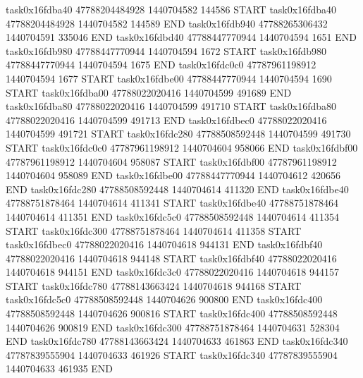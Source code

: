 task0x16fdba40 47788204484928          1440704582               144586  START
task0x16fdba40 47788204484928          1440704582               144589  END
task0x16fdb940 47788265306432          1440704591               335046  END
task0x16fdbd40 47788447770944          1440704594                 1651  END
task0x16fdb980 47788447770944          1440704594                 1672  START
task0x16fdb980 47788447770944          1440704594                 1675  END
task0x16fdc0c0 47787961198912          1440704594                 1677  START
task0x16fdbe00 47788447770944          1440704594                 1690  START
task0x16fdba00 47788022020416          1440704599               491689  END
task0x16fdba80 47788022020416          1440704599               491710  START
task0x16fdba80 47788022020416          1440704599               491713  END
task0x16fdbec0 47788022020416          1440704599               491721  START
task0x16fdc280 47788508592448          1440704599               491730  START
task0x16fdc0c0 47787961198912          1440704604               958066  END
task0x16fdbf00 47787961198912          1440704604               958087  START
task0x16fdbf00 47787961198912          1440704604               958089  END
task0x16fdbe00 47788447770944          1440704612               420656  END
task0x16fdc280 47788508592448          1440704614               411320  END
task0x16fdbe40 47788751878464          1440704614               411341  START
task0x16fdbe40 47788751878464          1440704614               411351  END
task0x16fdc5c0 47788508592448          1440704614               411354  START
task0x16fdc300 47788751878464          1440704614               411358  START
task0x16fdbec0 47788022020416          1440704618               944131  END
task0x16fdbf40 47788022020416          1440704618               944148  START
task0x16fdbf40 47788022020416          1440704618               944151  END
task0x16fdc3c0 47788022020416          1440704618               944157  START
task0x16fdc780 47788143663424          1440704618               944168  START
task0x16fdc5c0 47788508592448          1440704626               900800  END
task0x16fdc400 47788508592448          1440704626               900816  START
task0x16fdc400 47788508592448          1440704626               900819  END
task0x16fdc300 47788751878464          1440704631               528304  END
task0x16fdc780 47788143663424          1440704633               461863  END
task0x16fdc340 47787839555904          1440704633               461926  START
task0x16fdc340 47787839555904          1440704633               461935  END

